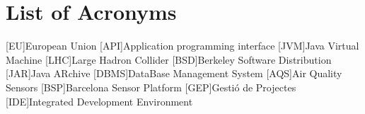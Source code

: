  
\chapter{List of Acronyms}
\begin{acronym}
  [EU]{European Union}
  [API]{Application programming interface}
  [JVM]{Java Virtual Machine}
  [LHC]{Large Hadron Collider}
  [BSD]{Berkeley Software Distribution}
  [JAR]{Java ARchive}
  [DBMS]{DataBase Management System}
  [AQS]{Air Quality Sensors}
  [BSP]{Barcelona Sensor Platform}
  [GEP]{Gestió de Projectes}
  [IDE]{Integrated Development Environment}
\end{acronym}
